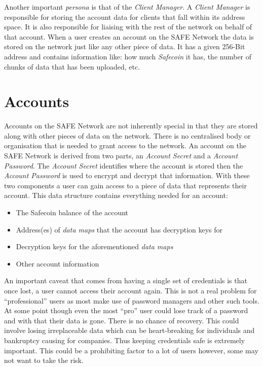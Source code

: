 Another important \textit{persona} is that of the \textit{Client Manager}. A \textit{Client Manager} is responsible for storing the account data for clients that fall within its address space. It is also responsible for liaising with the rest of the network on behalf of that account. When a user creates an account on the SAFE Network the data is stored on the network just like any other piece of data. It has a given 256-Bit address and contains information like: how much \textit{Safecoin} it has, the number of chunks of data that has been uploaded, etc.

\section{Accounts}

Accounts on the SAFE Network are not inherently special in that they are stored along with other pieces of data on the network. There is no centralised body or organisation that is needed to grant access to the network. An account on the SAFE Network is derived from two parts, an \textit{Account Secret} and a \textit{Account Password}. The \textit{Account Secret} identifies where the account is stored then the \textit{Account Password} is used to encrypt and decrypt that information. With these two components a user can gain access to a piece of data that represents their account. This data structure contains everything needed for an account:

\begin{itemize}
	\item The Safecoin balance of the account
	\item Address(es) of \textit{data maps} that the account has decryption keys for
	\item Decryption keys for the aforementioned \textit{data maps}
	\item Other account information
\end{itemize}
	
An important caveat that comes from having a single set of credentials is that once lost, a user cannot access their account again. This is not a real problem for ``professional'' users as most make use of password managers and other such tools. At some point though even the most ``pro'' user could lose track of a password and with that their data is gone. There is no chance of recovery. This could involve losing irreplaceable data which can be heart-breaking for individuals and bankruptcy causing for companies. Thus keeping credentials safe is extremely important. This could be a prohibiting factor to a lot of users however, some may not want to take the risk.
